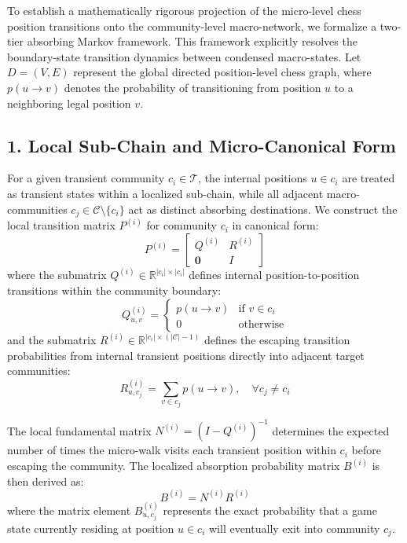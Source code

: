 \documentclass[9pt,twocolumn,twoside]{pnas-report}
\begin{document}
To establish a mathematically rigorous projection of the micro-level chess position transitions onto the community-level macro-network, we formalize a two-tier absorbing Markov framework. This framework explicitly resolves the boundary-state transition dynamics between condensed macro-states. Let $D = (V, E)$ represent the global directed position-level chess graph, where $p(u \to v)$ denotes the probability of transitioning from position $u$ to a neighboring legal position $v$.

\subsection*{1. Local Sub-Chain and Micro-Canonical Form}
For a given transient community $c_i \in \mathcal{T}$, the internal positions $u \in c_i$ are treated as transient states within a localized sub-chain, while all adjacent macro-communities $c_j \in \mathcal{C} \setminus \{c_i\}$ act as distinct absorbing destinations. We construct the local transition matrix $P^{(i)}$ for community $c_i$ in canonical form:
\begin{equation}
P^{(i)} = \begin{bmatrix} Q^{(i)} & R^{(i)} \\ \mathbf{0} & I \end{bmatrix}
\end{equation}
where the submatrix $Q^{(i)} \in \mathbb{R}^{|c_i| \times |c_i|}$ defines internal position-to-position transitions within the community boundary:
\begin{equation}
Q^{(i)}_{u,v} = \begin{cases} p(u \to v) & \text{if } v \in c_i \\ 0 & \text{otherwise} \end{cases}
\end{equation}
and the submatrix $R^{(i)} \in \mathbb{R}^{|c_i| \times (|\mathcal{C}|-1)}$ defines the escaping transition probabilities from internal transient positions directly into adjacent target communities:
\begin{equation}
R^{(i)}_{u,c_j} = \sum_{v \in c_j} p(u \to v), \quad \forall c_j \neq c_i
\end{equation}

The local fundamental matrix $N^{(i)} = (I - Q^{(i)})^{-1}$ determines the expected number of times the micro-walk visits each transient position within $c_i$ before escaping the community. The localized absorption probability matrix $B^{(i)}$ is then derived as:
\begin{equation}
B^{(i)} = N^{(i)} R^{(i)}
\end{equation}
where the matrix element $B^{(i)}_{u,c_j}$ represents the exact probability that a game state currently residing at position $u \in c_i$ will eventually exit into community $c_j$.
\end{document}
